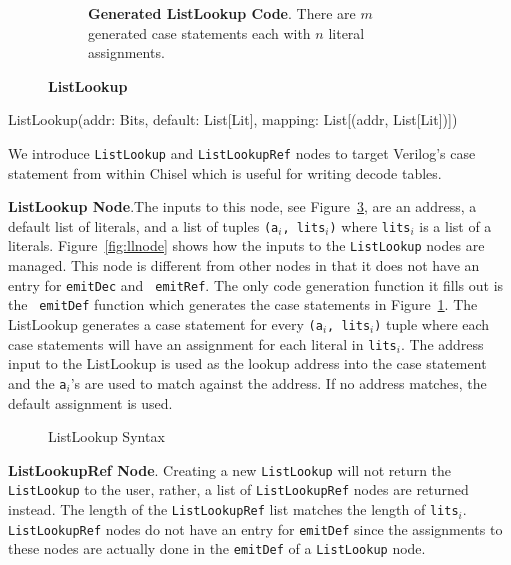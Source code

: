 \begin{figure}[htb]
\begin{subfigure}[t]{0.48\textwidth}
  \caption{{\bf Generated ListLookup Code}. There are $m$ generated
    case statements each with $n$ literal assignments.}
  \label{fig:llv}
  \end{subfigure}
\caption{{\bf ListLookup}}
\label{fig:ll}
\end{figure}

\begin{verbbox}
ListLookup(addr: Bits, default: List[Lit], 
                       mapping: List[(addr, List[Lit])])
\end{verbbox}

We introduce {\tt ListLookup} and {\tt ListLookupRef} nodes to target
Verilog's case statement from within Chisel which is useful for
writing decode tables.

\textbf{ListLookup Node}.The inputs to this node, see
Figure~\ref{fig:llsyntax}, are an address, a default list of literals,
and a list of tuples {\tt (a$_i$, lits$_i$)} where {\tt lits$_i$} is a list
of a literals. Figure~\ref{fig:llnode} shows how the inputs to the
{\tt ListLookup} nodes are managed. This node is different from other
nodes in that it does not have an entry for {\tt emitDec} and {\tt
emitRef}. The only code generation function it fills out is the {\tt
emitDef} function which generates the case statements in
Figure~\ref{fig:llv}. The ListLookup generates a case statement for
every {\tt (a$_i$, lits$_i$)} tuple where each case statements will
have an assignment for each literal in {\tt lits$_i$}. The address
input to the ListLookup is used as the lookup address into the case
statement and the {\tt a$_i$}'s are used to match against the
address. If no address matches, the default assignment is used.

\begin{figure}
\centering
\theverbbox
\caption{ListLookup Syntax}
\label{fig:llsyntax}
\end{figure}

\textbf{ListLookupRef Node}. Creating a new {\tt ListLookup} will not return
the {\tt ListLookup} to the user, rather, a list of 
{\tt ListLookupRef} nodes are returned instead. The length of the 
{\tt ListLookupRef} list matches the length of {\tt lits$_i$}. 
{\tt ListLookupRef} nodes do not have an entry for {\tt emitDef} since
the assignments to these nodes are actually done in the {\tt emitDef}
of a {\tt ListLookup} node.


